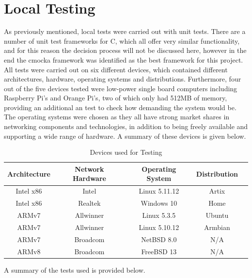 \documentclass[a4paper, 11pt]{report}
\begin{document}
\section{Local Testing} \label{loctest}
As previously mentioned, local tests were carried out with unit tests. There are a number of unit test frameworks for C, which all offer very similar functionality, and for this reason the decision process will not be discussed here, however in the end the cmocka\cite{cmocka} framework was identified as the best framework for this project. All tests were carried out on six different devices, which contained different architectures, hardware, operating systems and distributions. Furthermore, four out of the five devices tested were low-power single board computers including Raspberry Pi's and Orange Pi's, two of which only had 512MB of memory, providing an additional an test to check how demanding the system would be. The operating systems were chosen as they all have strong market shares in networking components and technologies, in addition to being freely available and supporting a wide range of hardware. A summary of these devices is given below.

\begin{table}[H]
\centering
\begin{tabular}{ |c|c|c|c|c| } 
\hline
Architecture & Network Hardware & Operating System & Distribution\\
\hline
Intel x86 & Intel & Linux 5.11.12 & Artix\\
Intel x86 & Realtek & Windows 10 & Home\\
ARMv7 & Allwinner & Linux 5.3.5 & Ubuntu\\
ARMv7 & Allwinner & Linux 5.10.12 & Armbian\\
ARMv7 & Broadcom & NetBSD 8.0 & N/A\\
ARMv8 & Broadcom & FreeBSD 13 & N/A\\
\hline
\end{tabular}
\caption{Devices used for Testing}
\label{tab:testdevices}
\end{table}

\iffalse
A summary of the tests used is provided below.
\end{document}
